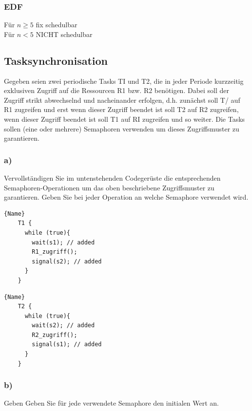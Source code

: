 \subsubsection{EDF}
Für $n\geq 5$ fix schedulbar\\
Für $n < 5 $ NICHT schedulbar\\


\subsection{Tasksynchronisation}
Gegeben seien zwei periodische Tasks TI und T2, die in jeder Periode kurzzeitig exklusiven Zugriff auf die Ressourcen R1 bzw. R2 
benötigen. Dabei soll der Zugriff strikt abwechselnd und nacheinander erfolgen, d.h. zunächst soll T/ auf R1 zugreifen 
und erst wenn dieser Zugriff beendet ist soll T2 auf R2 zugreifen, wenn dieser Zugriff beendet ist soll T1 auf RI zugreifen 
und so weiter. Die Tasks sollen (eine oder mehrere) Semaphoren verwenden um dieses Zugriffsmuster zu garantieren. 
\subsubsection{a)}
Vervollständigen Sie im untenstehenden Codegerüste die entsprechenden Semaphoren-Operationen um das oben beschriebene 
Zugriffsmuster zu garantieren. Geben Sie bei jeder Operation an welche Semaphore verwendet wird.

\noindent\begin{minipage}{.45\textwidth}
  \begin{lstlisting}[frame=tlrb]{Name}
    T1 {
      while (true){
        wait(s1); // added
        R1_zugriff();
        signal(s2); // added
      }
    }
  \end{lstlisting}
  \end{minipage}\hfill
  \begin{minipage}{.45\textwidth}
  \begin{lstlisting}[frame=tlrb]{Name}
    T2 {
      while (true){
        wait(s2); // added
        R2_zugriff();
        signal(s1); // added
      }
    }
  \end{lstlisting}
  \end{minipage}

\subsubsection{b)} 
Geben Geben Sie für jede verwendete Semaphore den initialen Wert an. 


